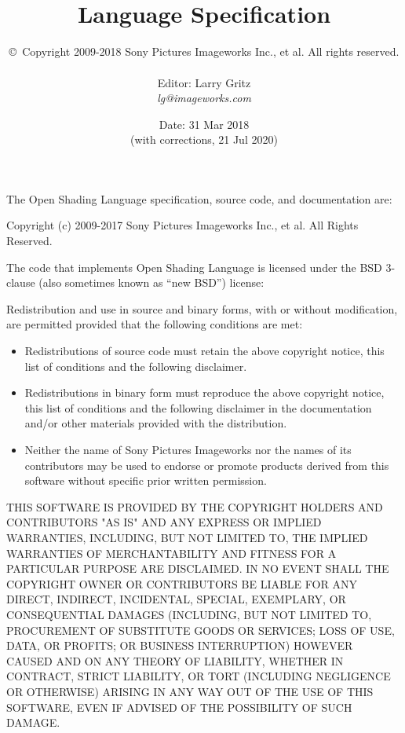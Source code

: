 \documentclass[11pt,letterpaper]{book}
\title{
{\Huge{\bf \product}
{\bf\sffamily \versionnumber} \medskip \\ \huge
Language Specification
} \bigskip }
\author{
\copyright\ Copyright 2009-2018 Sony Pictures Imageworks Inc., et al. All rights reserved.
 \bigskip \\
\vspace{1in} \\
Editor: Larry Gritz \\
\emph{lg@imageworks.com}
}
\date{{\large Date: 31 Mar 2018 \\
 (with corrections, 21 Jul 2020)
}
\bigskip
\bigskip
\bigskip
\bigskip
}
\begin{document}
\frontmatter

\maketitle

\newpage
\label{speccopyr}

\vspace*{0.2in}

\noindent The Open Shading Language specification, source code, and
documentation are:

\vspace*{0.2in}

Copyright (c) 2009-2017 Sony Pictures Imageworks Inc., et al.
All Rights Reserved.

\vspace{0.5in}

The code that implements Open Shading Language is licensed under
the BSD 3-clause (also sometimes known as ``new BSD'') license:

\vspace{0.25in}

Redistribution and use in source and binary forms, with or without
modification, are permitted provided that the following conditions are
met:

\begin{itemize}
\item Redistributions of source code must retain the above copyright
  notice, this list of conditions and the following disclaimer.
\item Redistributions in binary form must reproduce the above copyright
  notice, this list of conditions and the following disclaimer in the
  documentation and/or other materials provided with the distribution.
\item Neither the name of Sony Pictures Imageworks nor the names of its
  contributors may be used to endorse or promote products derived from
  this software without specific prior written permission.
\end{itemize}

THIS SOFTWARE IS PROVIDED BY THE COPYRIGHT HOLDERS AND CONTRIBUTORS
"AS IS" AND ANY EXPRESS OR IMPLIED WARRANTIES, INCLUDING, BUT NOT
LIMITED TO, THE IMPLIED WARRANTIES OF MERCHANTABILITY AND FITNESS FOR
A PARTICULAR PURPOSE ARE DISCLAIMED. IN NO EVENT SHALL THE COPYRIGHT
OWNER OR CONTRIBUTORS BE LIABLE FOR ANY DIRECT, INDIRECT, INCIDENTAL,
SPECIAL, EXEMPLARY, OR CONSEQUENTIAL DAMAGES (INCLUDING, BUT NOT
LIMITED TO, PROCUREMENT OF SUBSTITUTE GOODS OR SERVICES; LOSS OF USE,
DATA, OR PROFITS; OR BUSINESS INTERRUPTION) HOWEVER CAUSED AND ON ANY
THEORY OF LIABILITY, WHETHER IN CONTRACT, STRICT LIABILITY, OR TORT
(INCLUDING NEGLIGENCE OR OTHERWISE) ARISING IN ANY WAY OUT OF THE USE
OF THIS SOFTWARE, EVEN IF ADVISED OF THE POSSIBILITY OF SUCH DAMAGE.
\end{document}

